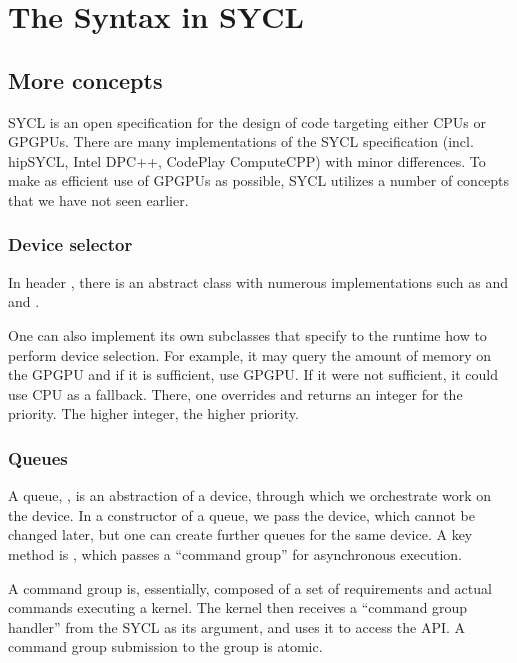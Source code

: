 \chapter{The Syntax in SYCL}

\section{More concepts}

SYCL is an open specification for the design of code targeting either CPUs or GPGPUs. 
There are many implementations of the SYCL specification (incl. hipSYCL, Intel DPC++, CodePlay ComputeCPP)
with minor differences. 
To make as efficient use of GPGPUs as possible, SYCL utilizes a number of concepts that 
we have not seen earlier.

\subsection{Device selector}

In header , there is an abstract class  with numerous implementations
such as  and  and .

One can also implement its own subclasses that specify to the runtime how to perform device selection.
For example, it may query the amount of memory on the GPGPU and if it is sufficient, 
use GPGPU. If it were not sufficient, it could use CPU as a fallback. 
There, one overrides 
and returns an integer for the priority. The higher integer, the higher priority. 

\subsection{Queues}

A queue, , is an abstraction of a device,
through which we orchestrate work on the device.
In a constructor of a queue, we pass the device, which cannot be changed later,
but one can create further queues for the same device.
A key method is ,
which passes a ``command group'' for asynchronous execution. 

A command group is, essentially, composed of a set of requirements and actual commands executing a kernel. 
The kernel then receives a ``command group handler'' from the SYCL as its argument,
and uses it to access the API. 
A command group submission to the group is atomic.  

